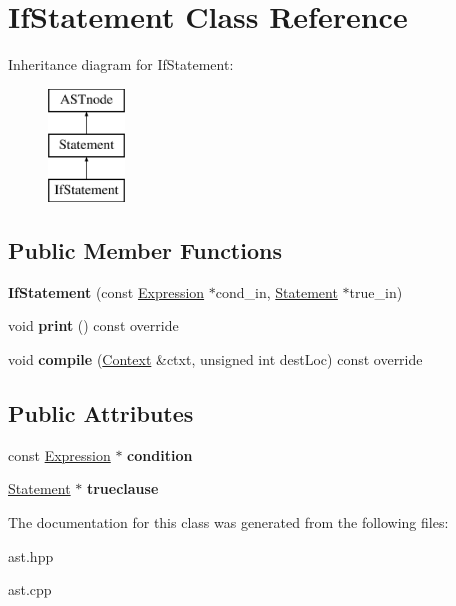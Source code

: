 \hypertarget{class_if_statement}{}\section{If\+Statement Class Reference}
\label{class_if_statement}
Inheritance diagram for If\+Statement\+:\begin{figure}[H]
\begin{center}
\leavevmode
\includegraphics[height=3.000000cm]{class_if_statement}
\end{center}
\end{figure}
\subsection*{Public Member Functions}
\begin{DoxyCompactItemize}
\item 
\mbox{\label{class_if_statement_acd21e3b7cf623247ddc4926ab342a92e}} 
{\bfseries If\+Statement} (const \hyperlink{class_expression}{Expression} $\ast$cond\+\_\+in, \hyperlink{class_statement}{Statement} $\ast$true\+\_\+in)
\item 
\mbox{\label{class_if_statement_a25238ee0d79d96c1c28a18cf8cd45396}} 
void {\bfseries print} () const override
\item 
\mbox{\label{class_if_statement_ac9134843bef45dd40db3cf1f5a282923}} 
void {\bfseries compile} (\hyperlink{class_context}{Context} \&ctxt, unsigned int dest\+Loc) const override
\end{DoxyCompactItemize}
\subsection*{Public Attributes}
\begin{DoxyCompactItemize}
\item 
\mbox{\label{class_if_statement_a67ece738b44b6d4abd5919193147872c}} 
const \hyperlink{class_expression}{Expression} $\ast$ {\bfseries condition}
\item 
\mbox{\label{class_if_statement_a8c21d800142cba3f2845f19b47f51c67}} 
\hyperlink{class_statement}{Statement} $\ast$ {\bfseries trueclause}
\end{DoxyCompactItemize}


The documentation for this class was generated from the following files\+:\begin{DoxyCompactItemize}
\item 
ast.\+hpp\item 
ast.\+cpp\end{DoxyCompactItemize}
